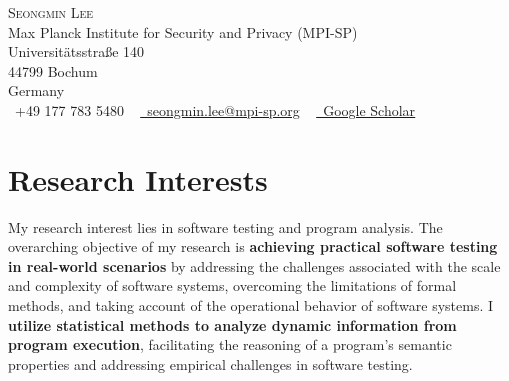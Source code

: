 \documentclass[letterpaper,11pt]{article}
\begin{document}



{\Huge \scshape Seongmin Lee} \\ \vspace{10pt}
Max Planck Institute for Security and Privacy (MPI-SP) \\
Universitätsstraße 140 \\
44799 Bochum \\
Germany \\ \vspace{5pt}
\small \raisebox{-0.1\height}\faPhone\ +49 177 783 5480  ~ \href{mailto:seongmin.lee@mpi-sp.org}{\raisebox{-0.2\height}\faEnvelope\  \underline{seongmin.lee@mpi-sp.org}} ~
\href{https://scholar.google.com/citations?user=-YSnc6kAAAAJ&hl=en}{\raisebox{-0.2\height}\faUniversity\ \underline{Google Scholar}}  ~

\section{Research Interests}

My research interest lies in software testing and program analysis. The overarching objective of my research is \textbf{achieving practical software testing in real-world scenarios} by addressing the challenges associated with the scale and complexity of software systems, overcoming the limitations of formal methods, and taking account of the operational behavior of software systems. I \textbf{utilize statistical methods to analyze dynamic information from program execution}, facilitating the reasoning of a program's semantic properties and addressing empirical challenges in software testing.


\end{document}
